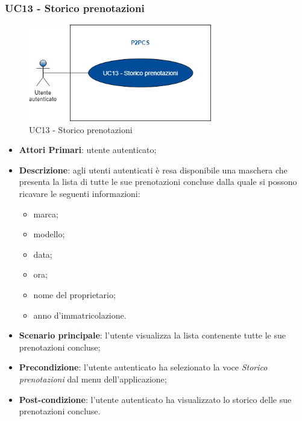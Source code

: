 \subsubsection{UC13 - Storico prenotazioni}
 \begin{figure}[h]
	\includegraphics[width=8cm]{res/images/Schemagenerale4.png}
	\centering
	\caption{UC13 - Storico prenotazioni}
\end{figure}
\begin{itemize}
	\item \textbf{Attori Primari}: utente autenticato;
	\item \textbf{Descrizione}: agli utenti autenticati è resa disponibile una maschera che presenta la lista di tutte le sue prenotazioni concluse dalla quale si possono ricavare le seguenti informazioni:
	\begin{itemize}
		\item marca;
		\item modello;
		\item data;
		\item ora;
		\item nome del proprietario;
		\item anno d'immatricolazione.
	\end{itemize} 
	\item \textbf{Scenario principale}: l'utente visualizza la lista contenente tutte le sue prenotazioni concluse;
	\item \textbf{Precondizione}: l'utente autenticato ha selezionato la voce \textit{Storico prenotazioni} dal menu dell'applicazione;
	\item \textbf{Post-condizione}: l'utente autenticato ha visualizzato lo storico delle sue prenotazioni concluse. 
\end{itemize} 
